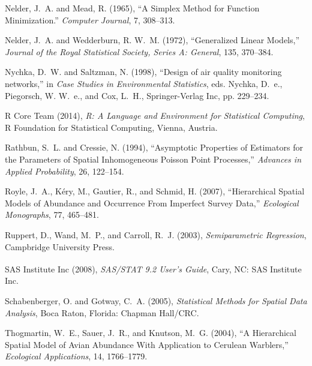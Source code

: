 \documentclass[12pt, titlepage]{article}\usepackage[]{graphicx}\usepackage[]{color}
\begin{document}
\begin{thebibliography}{47}
Nelder, J.~A. and Mead, R. (1965), \enquote{A Simplex Method for Function
  Minimization.} \textit{Computer Journal}, 7, 308--313.

Nelder, J.~A. and Wedderburn, R. W.~M. (1972), \enquote{Generalized Linear
  Models,} \textit{Journal of the Royal Statistical Society, Series A:
  General}, 135, 370--384.

Nychka, D.~W. and Saltzman, N. (1998), \enquote{Design of air quality
  monitoring networks,} in \textit{Case Studies in Environmental Statistics},
  eds. Nychka, D.~e., Piegorsch, W. W.~e., and Cox, L.~H., Springer-Verlag Inc,
  pp. 229--234.

{R Core Team} (2014), \textit{R: A Language and Environment for Statistical
  Computing}, R Foundation for Statistical Computing, Vienna, Austria.

Rathbun, S.~L. and Cressie, N. (1994), \enquote{Asymptotic Properties of
  Estimators for the Parameters of Spatial Inhomogeneous Poisson Point
  Processes,} \textit{Advances in Applied Probability}, 26, 122--154.

Royle, J.~A., K\'ery, M., Gautier, R., and Schmid, H. (2007),
  \enquote{Hierarchical Spatial Models of Abundance and Occurrence From
  Imperfect Survey Data,} \textit{Ecological Monographs}, 77, 465--481.

Ruppert, D., Wand, M.~P., and Carroll, R.~J. (2003), \textit{Semiparametric
  Regression}, Campbridge University Press.

{SAS Institute Inc} (2008), \textit{SAS/STAT\textsuperscript{\textregistered}
  9.2 User’s Guide}, Cary, NC: SAS Institute Inc.

Schabenberger, O. and Gotway, C.~A. (2005), \textit{Statistical Methods for
  Spatial Data Analysis}, Boca Raton, Florida: Chapman Hall/CRC.

Thogmartin, W.~E., Sauer, J.~R., and Knutson, M.~G. (2004), \enquote{A
  Hierarchical Spatial Model of Avian Abundance With Application to Cerulean
  Warblers,} \textit{Ecological Applications}, 14, 1766--1779.


\end{thebibliography}
\end{document}

